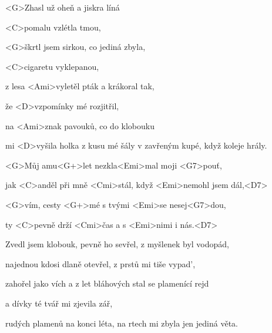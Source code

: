 

\zs
<G>Zhasl už oheň a jiskra líná

<C>pomalu vzlétla tmou,

<G>škrtl jsem sirkou, co jediná zbyla,

<C>cigaretu vyklepanou,

z lesa <Ami>vyletěl pták a krákoral tak,

že <D>vzpomínky mé rozjitřil,

na <Ami>znak pavouků, co do klobouku

mi <D>vyšila holka z kusu mé šály v zavřeným kupé, když koleje hrály.
\ks


\zr
<G>Můj amu<G+>let nezkla<Emi>mal moji <G7>pouť,

jak <C>anděl při mně <Cmi>stál, když <Emi>nemohl jsem dál,<D7>

<G>vím, cesty <G+>mé s tvými <Emi>se nesej<G7>dou,

ty <C>pevně drží <Cmi>čas a s <Emi>nimi i nás.<D7>
\kr

\zs
Zvedl jsem klobouk, pevně ho sevřel, z myšlenek byl vodopád,

najednou kdosi dlaně otevřel, z prstů mi tiše vypad',

zahořel jako vích a z let bláhových stal se plamenící rejd

a dívky té tvář mi zjevila zář,

rudých plamenů na konci léta, na rtech mi zbyla jen jediná věta.
\ks

\zr
\kr

\kp
